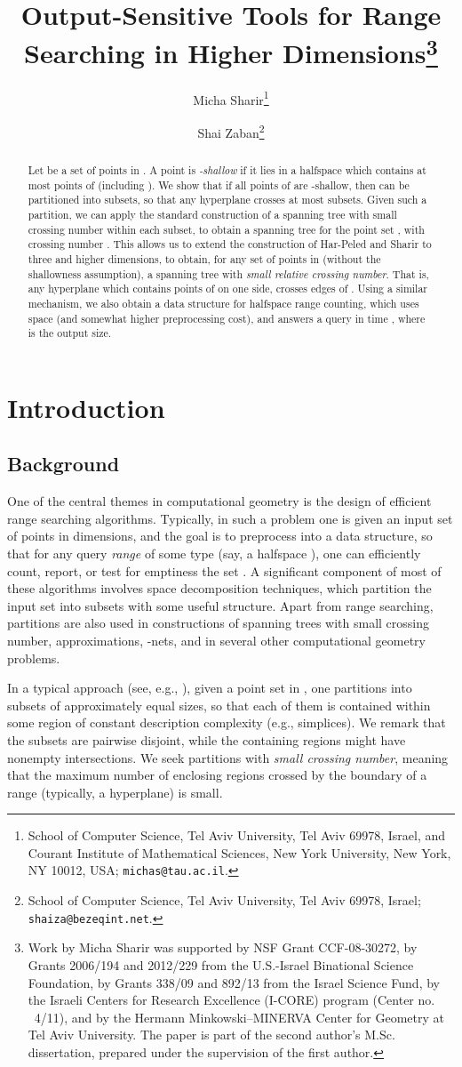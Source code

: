 \documentclass[11pt]{article}
\title{Output-Sensitive Tools for Range Searching in Higher Dimensions\thanks{Work by Micha Sharir was supported by NSF Grant CCF-08-30272, by Grants
2006/194 and 2012/229 from the U.S.-Israel Binational Science Foundation,
by Grants 338/09 and 892/13 from the Israel Science Fund, by the Israeli
Centers for Research Excellence (I-CORE) program (Center no. ~4/11), and
by the Hermann Minkowski--MINERVA Center for Geometry at Tel Aviv University.
The paper is part of the second author's M.Sc. dissertation, prepared under the supervision of the first author.
}}
\author{ Micha Sharir\thanks{School of Computer Science,
Tel Aviv University, Tel Aviv 69978, Israel, and
Courant Institute of Mathematical Sciences,
New York University, New York, NY 10012, USA;
\texttt{michas@tau.ac.il}.}
\and
Shai Zaban\thanks{School of Computer Science,
Tel Aviv University, Tel Aviv 69978, Israel;
\texttt{shaiza@bezeqint.net}.}}
\begin{document}
\maketitle

\begin{abstract}
Let  be a set of  points in . A point  is \emph{-shallow} if it lies in a halfspace which contains at most  points of 
(including ). We show that if all points of  are -shallow, then  can be partitioned into  subsets, so that any hyperplane crosses
at most  subsets. Given such a partition, we can apply the standard construction of a spanning tree with small
crossing number within each subset, to obtain a spanning tree for the point set , with crossing number . This allows us to extend the construction of Har-Peled and Sharir \cite{hs11} to three and higher dimensions, to obtain, for any set
of  points in  (without the shallowness assumption), a spanning tree  with {\em small relative crossing number}. That is, any hyperplane
which contains  points of  on one side, crosses  edges of . Using a similar mechanism,
we also obtain a data structure for halfspace range counting, which uses  space (and somewhat higher preprocessing cost), and answers a
query in time , where  is the output size.
\end{abstract}


\section{Introduction}

\subsection{Background}
One of the central themes in computational geometry is the design of efficient range searching algorithms. Typically, in such a problem one is given an
input set  of  points in  dimensions, and the goal is to preprocess  into a data structure, so that for any query {\em range} of some type (say,
a halfspace ), one can efficiently count, report, or test for emptiness the set . A significant component of most of these algorithms involves
space decomposition techniques, which partition the input set into subsets with some useful structure. Apart from range searching, partitions are also used
in constructions of spanning trees with small crossing number, approximations, -nets, and in several other computational geometry problems.

In a typical approach (see, e.g., \cite{mat92a}), given a point set  in , one partitions  into subsets of approximately equal sizes, so
that each of them is contained within some region of constant description complexity (e.g., simplices). We remark that the subsets are pairwise disjoint,
while the containing regions might have nonempty intersections. We seek partitions with {\em small crossing number}, meaning that the maximum number of
enclosing regions crossed by the boundary of a range (typically, a hyperplane) is small.
\end{document}
